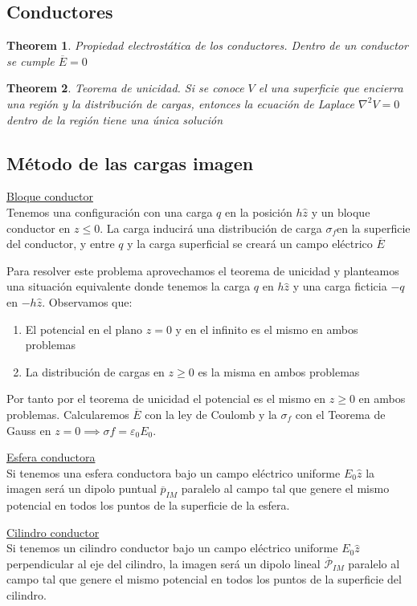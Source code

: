 \documentclass[leqno]{article}
\newtheorem*{theorem}{Theorem}
\begin{document}
\subsection{Conductores}
\begin{theorem}
Propiedad electrostática de los conductores. Dentro de un conductor se cumple $\boxed{\overline{E}=0}$ 
\end{theorem}

\begin{theorem}
Teorema de unicidad. Si se conoce $V$ el una superficie que encierra una región y la distribución de cargas, entonces la ecuación de Laplace $\nabla ^2V=0$ dentro de la región tiene una única solución
\end{theorem}

\subsection{Método de las cargas imagen}
\underline{Bloque conductor}\\
Tenemos una configuración con una carga $q$ en la posición  $h\hat{z}$ y un bloque conductor en $z\le 0$. La carga inducirá una distribución de carga $\sigma_f $en la superficie del conductor, y entre $q$ y la carga superficial se creará un campo eléctrico $\overline{E}$

Para resolver este problema aprovechamos el teorema de unicidad y planteamos una situación equivalente donde tenemos la carga $q$ en  $h\hat{z}$ y una carga ficticia $-q$ en $-h\hat{z}$. Observamos que:
\begin{enumerate}[topsep=0pt, itemsep=0pt]
  \item El potencial en el plano $z=0$ y en el infinito es el mismo en ambos problemas
  \item La distribución de cargas en $z\ge 0$ es la misma en ambos problemas
\end{enumerate}
Por tanto por el teorema de unicidad el potencial es el mismo en $z\ge 0$ en ambos problemas. Calcularemos $\overline{E}$ con la ley de Coulomb y la $\sigma _f$ con el Teorema de Gauss en $z=0 \implies \sigma f=\varepsilon _0 E_0$.

\underline{Esfera conductora} \\
Si tenemos una esfera conductora bajo un campo eléctrico uniforme $E_0\hat{z}$ la imagen será un dipolo puntual $\overline{p}_{IM}$ paralelo al campo tal que genere el mismo potencial en todos los puntos de la superficie de la esfera.

\underline{Cilindro conductor} \\
Si tenemos un cilindro conductor bajo un campo eléctrico uniforme $E_0\hat{z}$ perpendicular al eje del cilindro, la imagen será un dipolo lineal $\overline{\mathcal{P}}_{IM}$ paralelo al campo tal que genere el mismo potencial en todos los puntos de la superficie del cilindro.
\end{document}
